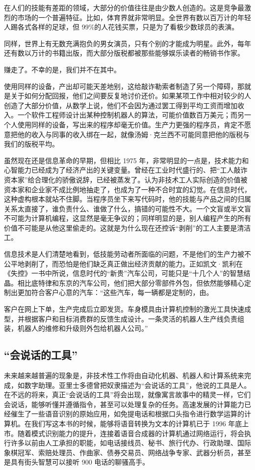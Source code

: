 在人们的技能有差距的领域，大部分的价值往往是由少数人创造的。这是竞争最激烈的市场的一个普遍特征。比如，体育界就非常明显。全世界有数以百万计的年轻人踢各式各样的足球，但 99\%的人花钱买票，只是为了看极少数球员的表演。

同样，世界上有无数充满抱负的男女演员，只有个别的才能成为明星。此外，每年还有数以万计的书籍出版，而大部分版税都被那些能够娱乐读者的畅销书作家。


赚走了。不幸的是，我们并不在其中。

使用同样的设备，产出却可能天差地别，这给敲诈勒索者制造了另一个障碍，那就是关于如何分配回报，他们之间要反复地讨价还价。如果某项工作中相对较少的人创造了大部分价值，从数学上说，他们不会因为通过罢工得到平均工资而增加收入。一个软件工程师设计出某种控制机器人的算法，可能价值数百万美元；而另一个人使用同样的设备，写出来的程序却毫无价值。生产力更强的程序员，肯定不愿意把他的收入与同事的收入绑在一起，就像汤姆·克兰西不可能同意把他的版税与我们的版税平均。

虽然现在还是信息革命的早期，但相比 1975 年，非常明显的一点是，技术能力和心智能力已经成为了经济产出的关键变量。曾经在工业时代盛行的、把“工人敲诈资本家”给合理化的骄傲说辞，已经被蒸发了。认为非技术工人实际创造的价值被资本家和企业家不成比例地抽走了，也成为了一种不合时宜的幻觉。在信息时代，这种虚构根本就站不住脚。当程序员坐下来写代码时，他的技能与产品之间的归属关系太直接了，谁负责什么、谁做了什么，搞错的可能性不大。一个文盲或半文盲不可能为计算机编程，这显然是毫无争议的；同样明显的是，别人编程产生的所有价值不可能是从他这里偷走的。这就是为什么现在还控诉“剥削”的工人主要是清洁工。

信息技术是人们清楚地看到，低技能劳动者所面临的问题，不是他们的生产力被不公平地剥削了，而恐怕是他们缺乏真正做出经济贡献的能力。正如凯文·凯利在《失控》一书中所说，信息时代的“新贵”汽车公司，可能只是“十几个人”的智慧结晶。相比底特律和东京的汽车公司，他们把大部分零部件外包，但依然能够精心定制出更加符合客户心意的汽车：“这些汽车，每一辆都是定制的，由。


客户在网上下单，生产完成后立即发货。车身模具由计算机控制的激光工具快速成型，并根据客户和目标消费群的反馈生成设计。一条灵活的机器人生产线负责组装，机器人的维修和升级则外包给机器人公司。”

\subsection{“会说话的工具”}
未来越来越普遍的现象是，非技术性工作将由自动化机器、机器人和计算系统来完成，如数字助理。亚里士多德曾把奴隶描述为“会说话的工具”，他说的工具是人。在不远的将来，真正“会说话的工具”将会出现，就像寓言故事中的精灵一样，它们会说话，能够听懂并遵循指令，甚至可以处理复杂的任务。高速发展的计算能力已经催生了一些语音识别的原始应用，如免提电话和根据口头指令进行数学运算的计算机。在我们写这本书的时候，能够将语音转换为文本的计算机已于 1996 年底上市。随着模式识别能力的提升，连接着语音合成器的计算机通过网络运行，将会执行许多以前由人工承担的职能，如电话接线员、秘书、旅行代办、行政助理、国际象棋冠军、索赔处理员、作曲家、债券交易员、网络战争专家、武器分析员，甚至是具有街头智慧可以接听 900 电话的聊骚高手。

